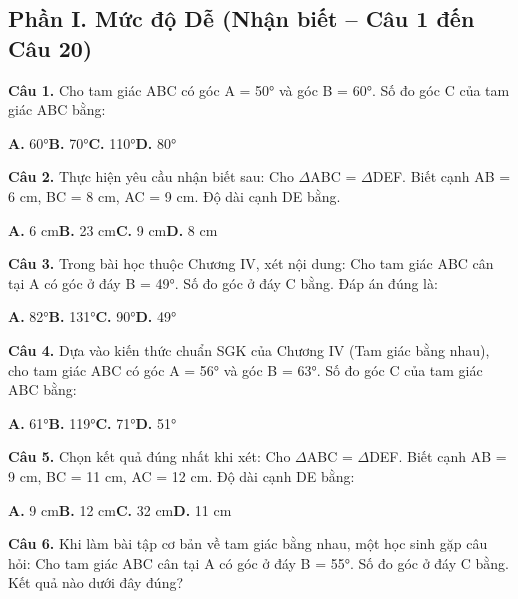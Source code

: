 \documentclass[11pt,a4paper]{article}
\begin{document}
\subsection*{\color{accent} Phần I. Mức độ Dễ (Nhận biết -- Câu 1 đến Câu 20)}
\textbf{\color{primary} Câu 1.} Cho tam giác ABC có góc A = 50° và góc B = 60°. Số đo góc C của tam giác ABC bằng:\par
\hspace*{1.5em}\textbf{A.} 60°\quad\quad \textbf{B.} 70°\quad\quad \textbf{C.} 110°\quad\quad \textbf{D.} 80°\par\vspace{2pt}
\textbf{\color{primary} Câu 2.} Thực hiện yêu cầu nhận biết sau: Cho $\Delta$ABC = $\Delta$DEF. Biết cạnh AB = 6 cm, BC = 8 cm, AC = 9 cm. Độ dài cạnh DE bằng.\par
\hspace*{1.5em}\textbf{A.} 6 cm\quad\quad \textbf{B.} 23 cm\quad\quad \textbf{C.} 9 cm\quad\quad \textbf{D.} 8 cm\par\vspace{2pt}
\textbf{\color{primary} Câu 3.} Trong bài học thuộc Chương IV, xét nội dung: Cho tam giác ABC cân tại A có góc ở đáy B = 49°. Số đo góc ở đáy C bằng. Đáp án đúng là:\par
\hspace*{1.5em}\textbf{A.} 82°\quad\quad \textbf{B.} 131°\quad\quad \textbf{C.} 90°\quad\quad \textbf{D.} 49°\par\vspace{2pt}
\textbf{\color{primary} Câu 4.} Dựa vào kiến thức chuẩn SGK của Chương IV (Tam giác bằng nhau), cho tam giác ABC có góc A = 56° và góc B = 63°. Số đo góc C của tam giác ABC bằng:\par
\hspace*{1.5em}\textbf{A.} 61°\quad\quad \textbf{B.} 119°\quad\quad \textbf{C.} 71°\quad\quad \textbf{D.} 51°\par\vspace{2pt}
\textbf{\color{primary} Câu 5.} Chọn kết quả đúng nhất khi xét: Cho $\Delta$ABC = $\Delta$DEF. Biết cạnh AB = 9 cm, BC = 11 cm, AC = 12 cm. Độ dài cạnh DE bằng:\par
\hspace*{1.5em}\textbf{A.} 9 cm\quad\quad \textbf{B.} 12 cm\quad\quad \textbf{C.} 32 cm\quad\quad \textbf{D.} 11 cm\par\vspace{2pt}
\textbf{\color{primary} Câu 6.} Khi làm bài tập cơ bản về tam giác bằng nhau, một học sinh gặp câu hỏi: Cho tam giác ABC cân tại A có góc ở đáy B = 55°. Số đo góc ở đáy C bằng. Kết quả nào dưới đây đúng?\par
\end{document}
